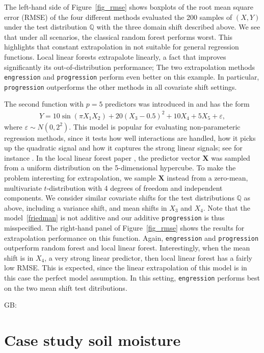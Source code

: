 \documentclass{statsoc}
\theoremstyle{break}
\newcommand{\gb}[1]{{\color{blue}  {GB: #1}}}
\newcommand{\Pte}{\mathbb Q}
\begin{document}
The left-hand side of Figure~\ref{fig_rmse} shows boxplots of the root mean square error (RMSE) of the four different methods evaluated the 200 samples of $(X,Y)$ under the test distribution $\Pte$ with the three domain shift described above.  
We see that under all scenarios, the classical random forest performs worst. This highlights that constant extrapolation in not suitable for general regression functions. Local linear forests extrapalote linearly, a fact that improves significantly its out-of-distribution performance; The two extrapolation methods \texttt{engression} and \texttt{progression} perform even better on this example. In particular, \texttt{progression} outperforms the other methods in all covariate shift settings. 

The second function with $p=5$ predictors was introduced in \cite{fri1991} and has the form
\begin{align}\label{friedman}
	Y = 10\sin(\pi X_1 X_2) + 20 (X_3 - 0.5)^2 + 10X_4 + 5X_5 + \varepsilon,
\end{align}
where $\varepsilon \sim N(0, 2^2)$. This model is popular for evaluating non-parameteric regression methods, since it tests how well interactions are handled, how it picks up the quadratic signal and how it captures the strong linear signals; see for instance \cite{chi2010}. In the local linear forest
paper \cite{friedberg:tibshirani:wager:2021}, the predictor vector $\mathbf X$ was sampled from a uniform distribution on the 5-dimensional hypercube. To make the problem interesting for extrapolation, we sample $\mathbf X$ instead from a zero-mean, multivariate $t$-distribution with 4 degrees of freedom and independent components. We consider similar covariate shifts for the test distributions $\Pte$ as above, including a variance shift, and mean shifts in $X_3$ and $X_4$.
Note that the model~\eqref{friedman} is not additive and our additive \texttt{progression} is thus misspecified. The right-hand panel of Figure~\ref{fig_rmse} shows the results for extrapolation performance on this function. Again, \texttt{engression} and \texttt{progression} outperform random forest and local linear forest. Interestingly, when the mean shift is in $X_4$, a very strong linear predictor, then local linear forest has a fairly low RMSE. This is expected, since the linear extrapolation of this model is in this case the perfect model assumption. In this setting, \texttt{engression} performs best on the two mean shift test ditributions.




\gb{
\section{Case study soil moisture}

}
\end{document}
